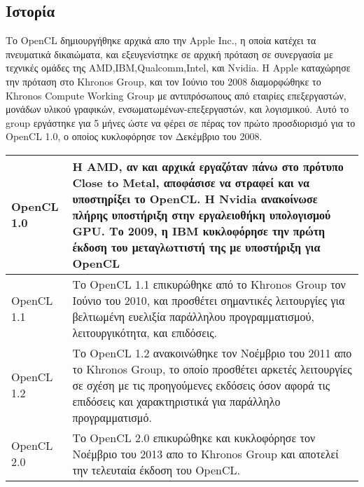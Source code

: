 \subsection{Ιστορία}
Το OpenCL δημιουργήθηκε αρχικά απο την Apple Inc., η οποία κατέχει τα πνευματικά δικαιώματα, και εξευγενίστηκε σε αρχική πρόταση σε συνεργασία με τεχνικές ομάδες της AMD,IBM,Qualcomm,Intel, και Nvidia. Η Apple καταχώρησε την πρόταση στο Khronos Group, και τον Ιούνιο του 2008 διαμορφώθηκε το Khronos Compute Working Group με αντιπρόσωπους από εταιρίες επεξεργαστών, μονάδων υλικού γραφικών, ενσωματωμένων-επεξεργαστών, και λογισμικού. Αυτό το group εργάστηκε για 5 μήνες ώστε να φέρει σε πέρας τον πρώτο προσδιορισμό για το OpenCL 1.0, ο οποίος κυκλοφόρησε τον Δεκέμβριο του 2008. 
\begin{table}[h]
	\begin{tabular}{|l|p{.9\linewidth}|}
	\hline
OpenCL 1.0 & Η AMD, αν και αρχικά εργαζόταν πάνω στο πρότυπο Close to Metal, αποφάσισε να στραφεί και να υποστηρίξει το OpenCL. Η Nvidia ανακοίνωσε πλήρης υποστήριξη στην εργαλειοθήκη υπολογισμού GPU. Το 2009, η IBM κυκλοφόρησε την πρώτη έκδοση του μεταγλωττιστή της με υποστήριξη για OpenCL\\ \hline
OpenCL 1.1 & Το OpenCL 1.1 επικυρώθηκε από το Khronos Group τον Ιούνιο του 2010, και προσθέτει σημαντικές λειτουργίες για βελτιωμένη ευελιξία παράλληλου προγραμματισμού, λειτουργικότητα, και επιδόσεις.\\ \hline
OpenCL 1.2 & Το OpenCL 1.2 ανακοινώθηκε τον Νοέμβριο του 2011 απο το Khronos Group, το οποίο προσθέτει αρκετές λειτουργίες σε σχέση με τις προηγούμενες εκδόσεις όσον αφορά τις επιδόσεις και χαρακτηριστικά για παράλληλο προγραμματισμό.\\ \hline
OpenCL 2.0 & Το OpenCL 2.0 επικυρώθηκε και κυκλοφόρησε τον Νοέμβριο του 2013 απο το Khronos Group και αποτελεί την τελευταία έκδοση του OpenCL. \\ \hline
	\end{tabular}
\end{table}

